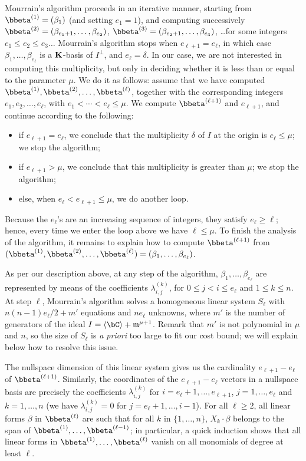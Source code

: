 \documentclass[12pt]{article}
\begin{document}
Mourrain's algorithm proceeds in an iterative manner, starting from
$\bbeta^{(1)}=(\beta_{1})$ (and setting $e_1=1$), and computing
successively $\bbeta^{(2)}=(\beta_{e_1+1},\dots,\beta_{e_2})$,
$\bbeta^{(3)}=(\beta_{e_2+1},\dots,\beta_{e_3})$, \dots for some
integers $e_1 \le e_2 \le e_3 \dots$ Mourrain's algorithm stops when
$e_{\ell+1}=e_{\ell}$, in which case $\beta_1,\dots,\beta_{e_\ell}$ is
a $\mathbf{K}$-basis of $I^\perp$, and $e_\ell=\delta$. In our case, we
are not interested in computing this multiplicity, but only in
deciding whether it is less than or equal to the parameter $\mu$. We do it as follows: assume that we have
computed $\bbeta^{(1)},\bbeta^{(2)},\dots,\bbeta^{(\ell)}$, together
with the corresponding integers $e_1,e_2,\dots,e_\ell$, with $e_1 <
\cdots < e_\ell \le \mu$. We compute $\bbeta^{(\ell+1)}$ and $e_{\ell+1}$,
and continue according to the following:
\begin{itemize}
\item if $e_{\ell+1}=e_{\ell}$, we conclude that the multiplicity
  $\delta$ of $I$ at the origin is $e_\ell \le \mu$; we stop the
  algorithm;
\item if $e_{\ell+1} > \mu$, we conclude that this multiplicity is greater 
  than $\mu$; we stop the algorithm;
\item else, when $e_\ell < e_{\ell+1} \le \mu$, we do another loop.
\end{itemize}
Because the $e_\ell$'s are an increasing sequence of integers, they
satisfy $e_\ell \ge \ell$; hence, every time we enter the loop above we
have $\ell \le \mu$. To finish the analysis of the algorithm, it
remains to explain how to compute $\bbeta^{(\ell+1)}$ from
$(\bbeta^{(1)},\bbeta^{(2)},\dots,\bbeta^{(\ell)})=(\beta_{1},\dots,\beta_{e_\ell})$.

As per our description above, at any step of the algorithm,
$\beta_{1},\dots,\beta_{e_\ell}$ are represented by means of the
coefficients $\lambda^{(k)}_{i,j}$, for $0 \le j < i \le e_{\ell}$ and
$1 \le k \le n$.  At step $\ell$, Mourrain's algorithm solves a homogeneous linear system
$S_\ell$ with $n(n-1) e_\ell/2+m'$ equations and $n e_\ell$ unknowns,
where $m'$ is the number of generators of the ideal $I= \langle \bC
\rangle + \m^{\mu+1}$. Remark that $m'$ is not polynomial in $\mu$ 
and $n$, so the size of $S_\ell$ is {\em a priori} too large to 
fit our cost bound; we will explain below how to resolve this issue.

The nullspace dimension of this linear system gives us the cardinality
$e_{\ell+1}-e_{\ell}$ of $\bbeta^{(\ell+1)}$. Similarly, the coordinates of
the $e_{\ell+1}-e_{\ell}$ vectors in a nullspace basis are precisely
the coefficients $\lambda^{(k)}_{i,j}$ for
$i=e_{\ell}+1,\dots,e_{\ell+1}$, $j=1,\dots,e_\ell$ and $k=1,\dots,n$
(we have $\lambda^{(k)}_{i,j}=0$ for $j=e_{\ell}+1,\dots,i-1$). For
all $\ell \ge 2$, all linear forms $\beta$ in $\bbeta^{(\ell)}$ are
such that for all $k$ in $\{1,\dots,n\}$, $X_k \cdot \beta$ belongs to
the span of $\bbeta^{(1)},\dots,\bbeta^{(\ell-1)}$; in particular, a
quick induction shows that all linear forms in
$\bbeta^{(1)},\dots,\bbeta^{(\ell)}$ vanish on all monomials of degree
at least $\ell$.
\end{document}
